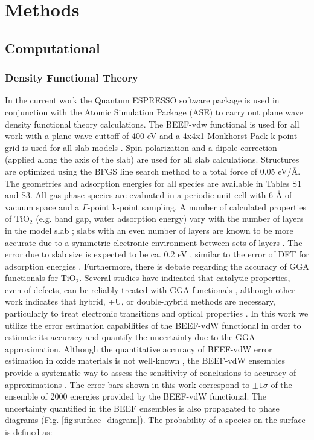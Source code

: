 \documentclass[journal=ascecg,manuscript=article,articletitle=true]{achemso}
\begin{document}
\section{Methods}
\label{sec:methods}
\subsection{Computational}
\subsubsection{Density Functional Theory}
In the current work the Quantum ESPRESSO software package\cite{QE-2009} is used in conjunction with the Atomic Simulation Package (ASE)\cite{ISI:000175131400009} to carry out plane wave density functional theory calculations. The BEEF-vdw functional \cite{Wellendorff_2012} is used for all work with a plane wave cuttoff of 400 eV and a 4x4x1 Monkhorst-Pack k-point grid is used for all slab models \cite{Monkhorst_1976}. Spin polarization and a dipole correction\cite{Bengtsson_1999} (applied along the axis of the slab) are used for all slab calculations. Structures are optimized using the BFGS line search method to a total force of 0.05 eV/\AA{}. The geometries and adsorption energies for all species are available in Tables S1 and S3. All gas-phase species are evaluated in a periodic unit cell with 6 \AA{} of vacuum space and a $\Gamma$-point k-point sampling. A number of calculated properties of TiO$_2$ (e.g. band gap, water adsorption energy) vary with the number of layers in the model slab \cite{Sun2010,Bredow2004,Patel2014}; slabs with an even number of layers are known to be more accurate due to a symmetric electronic environment between sets of layers \cite{Sun2010}. The error due to slab size is expected to be ca. 0.2 eV \cite{Sun2010}, similar to the error of DFT for adsorption energies \cite{Wellendorff_2015}. Furthermore, there is debate regarding the accuracy of GGA functionals for TiO$_2$. Several studies have indicated that catalytic properties, even of defects, can be reliably treated with GGA functionals \cite{Schaub_2001,Li_2008,Zheng_2016}, although other work indicates that hybrid, +U, or double-hybrid methods are necessary, particularly to treat electronic transitions and optical properties  \cite{Morgan_2007,Landmann_2012,De_k_2011, Jauho_2015}. In this work we utilize the error estimation capabilities of the BEEF-vdW functional \cite{Wellendorff_2012} in order to estimate its accuracy and quantify the uncertainty due to the GGA approximation. Although the quantitative accuracy of BEEF-vdW error estimation in oxide materials is not well-known \cite{Walker_2016}, the BEEF-vdW ensembles provide a systematic way to assess the sensitivity of conclusions to accuracy of approximations \cite{Medford_2015a}. The error bars shown in this work correspond to $\pm 1 \sigma$ of the ensemble of 2000 energies provided by the BEEF-vdW functional. The uncertainty quantified in the BEEF ensembles is also propagated to phase diagrams (Fig. \ref{fig:surface_diagram}). The probability of a species on the surface is defined as:
\end{document}
